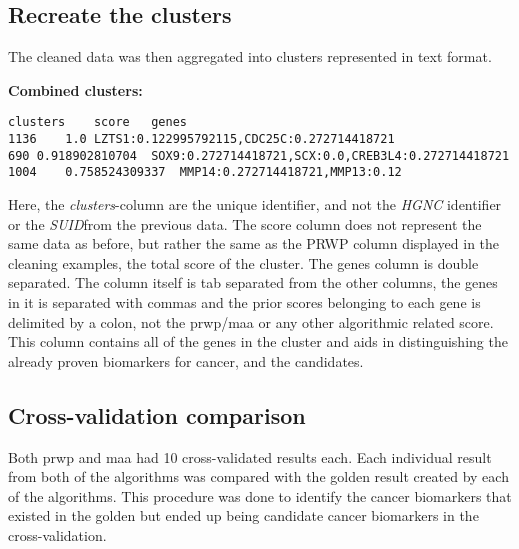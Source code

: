 \subsection{Recreate the clusters}
The cleaned data was then aggregated into clusters represented in text format.

\textbf{Combined clusters:}
\begin{Verbatim}[fontsize=\scriptsize]
clusters	score	genes
1136	1.0	LZTS1:0.122995792115,CDC25C:0.272714418721
690	0.918902810704	SOX9:0.272714418721,SCX:0.0,CREB3L4:0.272714418721
1004	0.758524309337	MMP14:0.272714418721,MMP13:0.12
\end{Verbatim}

Here, the \textit{clusters}-column are the unique identifier, and not the
\textit{HGNC} identifier or the \textit{SUID}from the previous data. The score
column does not represent the same data as before, but rather the same as the
PRWP column displayed in the cleaning examples, the total score of the cluster.
The genes column is double separated. The column itself is tab separated from
the other columns, the genes in it is separated with commas and the prior scores
belonging to each gene is delimited by a colon, not the \gls{prwp}/\gls{maa} or
any other algorithmic related score. This column contains all of the genes in
the cluster and aids in distinguishing the already proven biomarkers for cancer,
and the candidates.

\subsection{Cross-validation comparison}
Both \gls{prwp} and \gls{maa} had 10 cross-validated results each. Each
individual result from both of the algorithms was compared with the \gls{golden}
result created by each of the algorithms. This procedure was done to identify
the cancer biomarkers that existed in the \gls{golden} but ended up being
candidate cancer biomarkers in the cross-validation.

